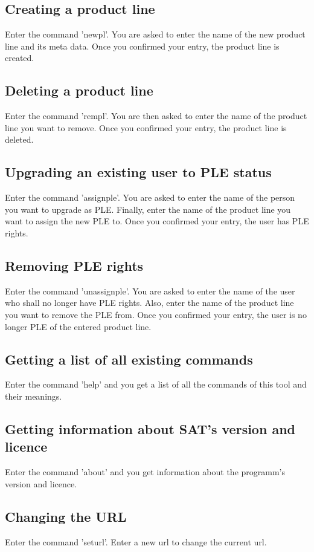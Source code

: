 \subsection{Creating a product line}
Enter the command 'newpl'. You are asked to enter the name of the new product
line and its meta data. Once you confirmed your entry, the product line is created.

\subsection{Deleting a product line}
Enter the command 'rempl'. You are then asked to enter the name of the product
line you want to remove. Once you confirmed your entry, the product line is deleted.

\subsection{Upgrading an existing user to PLE status}
Enter the command 'assignple'. You are asked to enter the name of the person you want
to upgrade as PLE. Finally, enter the name of the product line you want to assign
the new PLE to. Once you confirmed your entry, the user has PLE rights.

\subsection{Removing PLE rights}
Enter the command 'unassignple'. You are asked to enter the name of the user who shall 
no longer have PLE rights. Also, enter the name of the product line you want to
remove the PLE from. Once you confirmed your entry, the user is no longer PLE of
the entered product line.

\subsection{Getting a list of all existing commands}
Enter the command 'help' and you get a list of all the commands of this tool and
their meanings.

\subsection{Getting information about SAT's version and licence}
Enter the command 'about' and you get information about the programm's version and licence.

\subsection{Changing the URL}
Enter the command 'seturl'. Enter a new url to change the current url.

